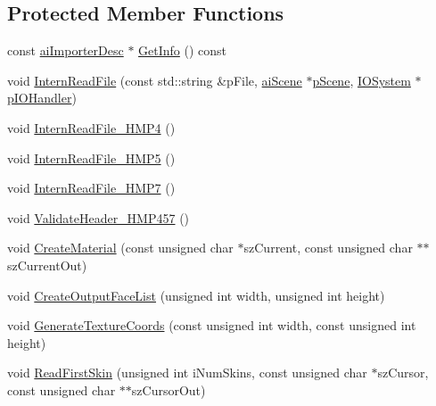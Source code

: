 \subsection*{Protected Member Functions}
\begin{DoxyCompactItemize}
\item 
const \hyperlink{structai_importer_desc}{ai\+Importer\+Desc} $\ast$ \hyperlink{class_assimp_1_1_h_m_p_importer_ab6cd7d09ef814859ac5e272844b1e6c4}{Get\+Info} () const 
\item 
void \hyperlink{class_assimp_1_1_h_m_p_importer_a11a230b849809ebaa0fde85f7869f14d}{Intern\+Read\+File} (const std\+::string \&p\+File, \hyperlink{structai_scene}{ai\+Scene} $\ast$\hyperlink{class_assimp_1_1_m_d_l_importer_a7c9f90a45d7a42bfc37d53bd8d7452e8}{p\+Scene}, \hyperlink{class_assimp_1_1_i_o_system}{I\+O\+System} $\ast$\hyperlink{class_assimp_1_1_m_d_l_importer_a5799905b6ba533b0f066684b859bc3d5}{p\+I\+O\+Handler})
\item 
void \hyperlink{class_assimp_1_1_h_m_p_importer_ab5af87ce726228d139e2304ab481fc1b}{Intern\+Read\+File\+\_\+\+H\+M\+P4} ()
\item 
void \hyperlink{class_assimp_1_1_h_m_p_importer_a3536e76fa4afa09d16a3feb897ddc548}{Intern\+Read\+File\+\_\+\+H\+M\+P5} ()
\item 
void \hyperlink{class_assimp_1_1_h_m_p_importer_ae6325560bede59406342e56eb898b4c4}{Intern\+Read\+File\+\_\+\+H\+M\+P7} ()
\item 
void \hyperlink{class_assimp_1_1_h_m_p_importer_a447064760ffaffb9fe9532200056dca4}{Validate\+Header\+\_\+\+H\+M\+P457} ()
\item 
void \hyperlink{class_assimp_1_1_h_m_p_importer_af7848d5490b6c72bb5747a2c0a9ece6a}{Create\+Material} (const unsigned char $\ast$sz\+Current, const unsigned char $\ast$$\ast$sz\+Current\+Out)
\item 
void \hyperlink{class_assimp_1_1_h_m_p_importer_a87829d4157cd41f98d2c386e450b6fcd}{Create\+Output\+Face\+List} (unsigned int width, unsigned int height)
\item 
void \hyperlink{class_assimp_1_1_h_m_p_importer_a487698e3c1f9f7887559675354a3e011}{Generate\+Texture\+Coords} (const unsigned int width, const unsigned int height)
\item 
void \hyperlink{class_assimp_1_1_h_m_p_importer_a20c1e5069ae0918e20311b1c380c2866}{Read\+First\+Skin} (unsigned int i\+Num\+Skins, const unsigned char $\ast$sz\+Cursor, const unsigned char $\ast$$\ast$sz\+Cursor\+Out)
\end{DoxyCompactItemize}
